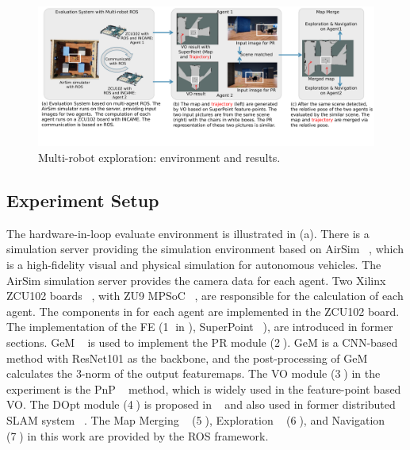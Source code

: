 \label{sec:experiments}


\begin{figure}[t]
  \centering
  \includegraphics[width=0.99\linewidth]{fig/env.pdf}
  \caption{Multi-robot exploration: environment and results. }
  \label{fig:env}
\end{figure}





\subsection{ Experiment Setup }

The hardware-in-loop evaluate environment is illustrated in (a). There is a simulation server providing the simulation environment based on AirSim  ~\cite{shah2018airsim}, which is a high-fidelity visual and physical simulation for autonomous vehicles. The AirSim simulation server provides the camera data for each agent. Two Xilinx ZCU102 boards  ~\cite{zcu102}, with ZU9 MPSoC  ~\cite{MPSoC}, are responsible for the calculation of each agent. 
The components in  for each agent are implemented in the ZCU102 board. The implementation of the FE (\textcircled{1} in ), SuperPoint ~\cite{detone2018superpoint}), are introduced in former sections. GeM  ~\cite{radenovic2018fine} is used to implement the PR module (\textcircled{2}). GeM is a CNN-based method with ResNet101 \cite{he2016deep} as the backbone, and the post-processing of GeM calculates the 3-norm of the output featuremaps.
The VO module (\textcircled{3}) in the experiment is the PnP  ~\cite{LepetitMoreno-Noguer-EPnP} method, which is widely used in the feature-point based VO. 
The DOpt module (\textcircled{4}) is proposed in  ~\cite{Choudhary:2017e66} and also used in former distributed SLAM system ~\cite{cieslewski2018data}. 
The Map Merging  ~\cite{Andre2014} (\textcircled{5}), Exploration  ~\cite{8202319} (\textcircled{6}), and Navigation  ~\cite{tbd} (\textcircled{7}) in this work are provided by the ROS framework. 

